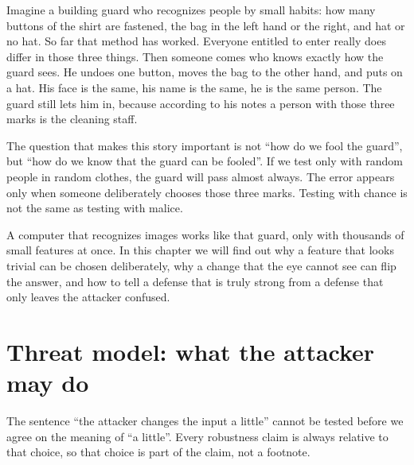 \begin{untukanak}
Imagine a building guard who recognizes people by small habits: how many buttons of
the shirt are fastened, the bag in the left hand or the right, and hat or no hat. So
far that method has worked. Everyone entitled to enter really does differ in those
three things. Then someone comes who knows exactly how the guard sees. He undoes one
button, moves the bag to the other hand, and puts on a hat. His face is the same, his
name is the same, he is the same person. The guard still lets him in, because
according to his notes a person with those three marks is the cleaning staff.

The question that makes this story important is not ``how do we fool the guard'',
but ``how do we know that the guard can be fooled''. If we test only with random
people in random clothes, the guard will pass almost always. The error appears only
when someone deliberately chooses those three marks. Testing with chance is not the
same as testing with malice.

A computer that recognizes images works like that guard, only with thousands of small
features at once. In this chapter we will find out why a feature that looks trivial
can be chosen deliberately, why a change that the eye cannot see can flip the answer,
and how to tell a defense that is truly strong from a defense that only leaves the
attacker confused.
\end{untukanak}

\section{Threat model: what the attacker may do}

The sentence ``the attacker changes the input a little'' cannot be tested before we
agree on the meaning of ``a little''. Every robustness claim is always relative to
that choice, so that choice is part of the claim, not a footnote.


